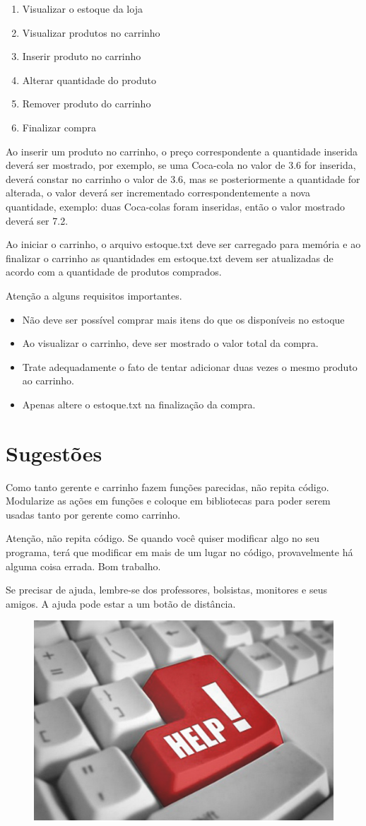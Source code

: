 \documentclass[12pt]{article}
\begin{document}
\begin{enumerate}
  \item Visualizar o estoque da loja
  \item Visualizar produtos no carrinho
  \item Inserir produto no carrinho
  \item Alterar quantidade do produto
  \item Remover produto do carrinho
  \item Finalizar compra
\end{enumerate}

Ao inserir um produto no carrinho, o preço correspondente a quantidade inserida deverá ser mostrado, por exemplo, se uma Coca-cola no valor de 3.6 for inserida, deverá constar no carrinho o valor de 3.6, mas se posteriormente a quantidade for alterada, o valor deverá ser incrementado correspondentemente a nova quantidade, exemplo: duas Coca-colas foram inseridas, então o valor mostrado deverá ser 7.2.

Ao iniciar o carrinho, o arquivo estoque.txt deve ser carregado para memória e ao finalizar o carrinho as quantidades em estoque.txt devem ser atualizadas de acordo com a quantidade de produtos comprados.

Atenção a alguns requisitos importantes.
\begin{itemize}
\item Não deve ser possível comprar mais itens do que os disponíveis no estoque
\item Ao visualizar o carrinho, deve ser mostrado o valor total da compra.
\item Trate adequadamente o fato de tentar adicionar duas vezes o mesmo produto ao carrinho.
\item Apenas altere o estoque.txt na finalização da compra.
\end{itemize}

\section{Sugestões}

Como tanto gerente e carrinho fazem funções parecidas, não repita código. Modularize as ações em funções e coloque em bibliotecas para poder serem usadas tanto por gerente como carrinho. 

Atenção, não repita código. Se quando você quiser modificar algo no seu programa, terá que modificar em mais de um lugar no código, provavelmente há alguma coisa errada. Bom trabalho.

Se precisar de ajuda, lembre-se dos professores, bolsistas, monitores e seus amigos. A ajuda pode estar a um botão de distância.

\begin{figure}[h!]
\centering
\includegraphics[width=0.4\linewidth]{./imagens/help}
\end{figure}
\end{document}
